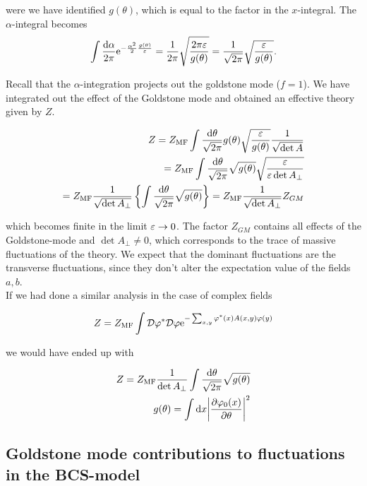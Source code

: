 were we have identified $g(\theta)$, which is equal to the factor in the $x$-integral. The $\alpha$-integral becomes 
\begin{align*}
    \int \frac{\dd \alpha}{2\pi} \mathrm{e}^{-\frac{\alpha^2}{2}\frac{g(\theta)}{\varepsilon}} = \frac{1}{2\pi}\sqrt{\frac{2\pi \varepsilon}{g(\theta)}} =  \frac{1}{\sqrt{
    2\pi}}\sqrt{\frac{\varepsilon}{g(\theta)}}. 
\end{align*}

Recall that the $\alpha$-integration projects out the goldstone mode ($f = 1$). We have integrated out the effect of the Goldstone mode and obtained an effective theory given by $Z$. 

\begin{align*}
    Z = Z_{\text{MF}}\int \frac{\dd \theta}{\sqrt{2\pi}} g(\theta) \sqrt{\frac{\varepsilon}{g(\theta)}} \frac{1}{\sqrt{\det A}} \\
    = Z_{\text{MF}}\int \frac{\dd \theta}{\sqrt{2\pi}} \sqrt{
    g(\theta)} \sqrt{\frac{\varepsilon}{\varepsilon\det A_\perp}} \\ 
    = Z_{\text{MF}} \frac{1}{\sqrt{\det A_\perp}} \left\{ \int \frac{\dd \theta}{\sqrt{2\pi}}\sqrt{g(\theta)} \right\} = Z_{\text{MF}} \frac{1}{\sqrt{\det A_\perp}} Z_{GM}
\end{align*}

which becomes finite in the limit $\varepsilon \to 0$. The factor $Z_{GM}$ contains all effects of the Goldstone-mode and $\det A_\perp \neq 0$, which corresponds to the trace of massive fluctuations of the theory. We expect that the dominant fluctuations are the transverse fluctuations, since they don't alter the expectation value of the fields $a,b$. \\ 

If we had done a similar analysis in the case of complex fields

\begin{align*}
    Z = Z_{\text{MF}} \int \mathcal{D} \varphi^* \mathcal{D} \varphi \mathrm{e}^{-\sum_{x,y} \varphi^*(x) A(x,y) \varphi (y)}
\end{align*}

we would have ended up with 

\begin{align*}
    Z = Z_{\text{MF}} \frac{1}{\det A_\perp} \int \frac{\dd \theta}{\sqrt{2\pi}}\sqrt{g(\theta)} \\ g(\theta) = \int \dd x \abs{\pdv{\varphi_0(x)}{\theta}}^2 
\end{align*}

\subsection{Goldstone mode contributions to fluctuations in the BCS-model}

